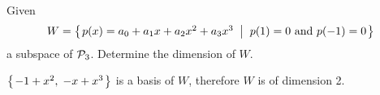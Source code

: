 
\begin{Exercise}[
name={},
title={}, 
difficulty=0,
origin={\cite{YL}}]
Given \[W=\mbox{$\left\{\hspace{0.1em}p(x)=a_0+a_1x+a_2x^2+a_3x^3 \;\;\middle|\;\; p(1)=0 \text{ and } p(-1)=0\hspace{0.1em}\right\}$}\] a subspace of $\mathcal{P}_3$. Determine the dimension of $W$.

\end{Exercise}

\begin{Answer}
$\mbox{$\left\{\hspace{0.1em}-1+x^2,\;-x+x^3\hspace{0.1em}\right\}$}$ is a basis of $W$, therefore $W$ is of dimension 2.
\end{Answer}
